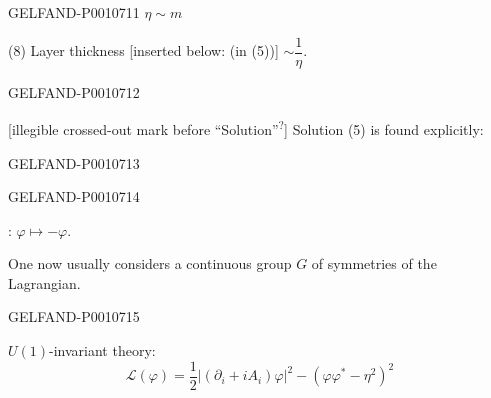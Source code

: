 \begin{GelfandAdjacentEvidence}{GELFAND-P001071}{1}
$\eta\sim m$

(8) Layer thickness [inserted below: (in (5))] $\sim\dfrac1\eta$.
\end{GelfandAdjacentEvidence}
\begin{GelfandAdjacentEvidence}{GELFAND-P001071}{2}


[illegible crossed-out mark before “Solution”\textsuperscript{?}] Solution (5) is found explicitly: 
\end{GelfandAdjacentEvidence}
\begin{GelfandAdjacentEvidence}{GELFAND-P001071}{3}

\end{GelfandAdjacentEvidence}
\begin{GelfandAdjacentEvidence}{GELFAND-P001071}{4}


: $\varphi\mapsto-\varphi$.

One now usually considers a continuous group $G$ of symmetries of the Lagrangian.
\end{GelfandAdjacentEvidence}
\begin{GelfandAdjacentEvidence}{GELFAND-P001071}{5}


$U(1)$-invariant theory:
\begin{equation*}
\mathcal{L}(\varphi)=\frac12\bigl|(\partial_i+iA_i)\varphi\bigr|^2-(\varphi\varphi^*-\eta^2)^2
\tag{9}
\end{equation*}
\end{GelfandAdjacentEvidence}
